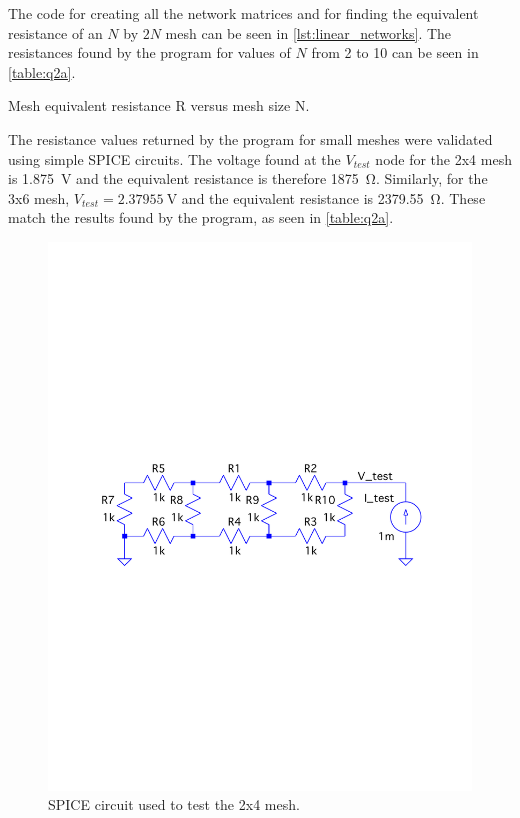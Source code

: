 \documentclass[a4paper,titlepage]{article}
\begin{document}
	The code for creating all the network matrices and for finding the equivalent resistance of an $N$ by $2N$ mesh can be seen in \autoref{lst:linear_networks}. The resistances found by the program for values of $N$ from 2 to 10 can be seen in \autoref{table:q2a}.
	
	\begin{table}[!htb]
		\centering
		\caption{Mesh equivalent resistance R versus mesh size N.}
		\label{table:q2a}
	\end{table}

	The resistance values returned by the program for small meshes were validated using simple SPICE circuits. The voltage found at the $V_{test}$ node for the 2x4 mesh is \SI{1.875}{\volt} and the equivalent resistance is therefore \SI{1875}{\ohm}. Similarly, for the 3x6 mesh, $V_{test} = \SI{2.37955}{\volt}$ and the equivalent resistance is \SI{2379.55}{\ohm}. These match the results found by the program, as seen in \autoref{table:q2a}.
	
	\begin{figure}[!htb]
		\centering
		\includegraphics[width=\columnwidth]{plots/q2a_mesh_2.pdf}
		\caption
		{SPICE circuit used to test the 2x4 mesh.}
		\label{fig:q2a_mesh_2}
	\end{figure}
\end{document}
